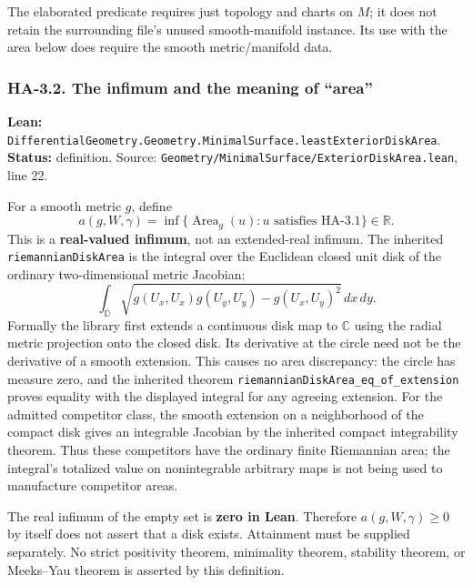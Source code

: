 \documentclass[
  letterpaper,
  11pt]{article}
\begin{document}
The elaborated predicate requires just topology and charts on \(M\); it
does not retain the surrounding file's unused smooth-manifold instance.
Its use with the area below does require the smooth metric/manifold
data.

\subsubsection{HA-3.2. The infimum and the meaning of
``area''}\label{ha-3-2}

\textbf{Lean:}
{\small\texttt{Differential\allowbreak{}Geometry.\allowbreak{}Geometry.\allowbreak{}Minimal\allowbreak{}Surface.\allowbreak{}least\allowbreak{}Exterior\allowbreak{}Disk\allowbreak{}Area}}.
\textbf{Status:} definition. Source:
{\small\texttt{Geometry/\allowbreak{}Minimal\allowbreak{}Surface/\allowbreak{}Exterior\allowbreak{}Disk\allowbreak{}Area.\allowbreak{}lean}},
line 22.

For a smooth metric \(g\), define \[
 a(g,W,\gamma)=\inf\{\operatorname{Area}_g(u):
       u\text{ satisfies HA-3.1}\}\in\mathbb R.
\] This is a \textbf{real-valued infimum}, not an extended-real infimum.
The inherited
{\small\texttt{riemannian\allowbreak{}Disk\allowbreak{}Area}} is the
integral over the Euclidean closed unit disk of the ordinary
two-dimensional metric Jacobian: \[
 \int_{\overline{\mathbb D}}
 \sqrt{g(U_x,U_x)g(U_y,U_y)-g(U_x,U_y)^2}\,dx\,dy.
\] Formally the library first extends a continuous disk map to
\(\mathbb C\) using the radial metric projection onto the closed disk.
Its derivative at the circle need not be the derivative of a smooth
extension. This causes no area discrepancy: the circle has measure zero,
and the inherited theorem
{\small\texttt{riemannian\allowbreak{}Disk\allowbreak{}Area\_\allowbreak{}eq\_\allowbreak{}of\_\allowbreak{}extension}}
proves equality with the displayed integral for any agreeing extension.
For the admitted competitor class, the smooth extension on a
neighborhood of the compact disk gives an integrable Jacobian by the
inherited compact integrability theorem. Thus these competitors have the
ordinary finite Riemannian area; the integral's totalized value on
nonintegrable arbitrary maps is not being used to manufacture competitor
areas.

The real infimum of the empty set is \textbf{zero in Lean}. Therefore
\(a(g,W,\gamma)\ge0\) by itself does not assert that a disk exists.
Attainment must be supplied separately. No strict positivity theorem,
minimality theorem, stability theorem, or Meeks--Yau theorem is asserted
by this definition.
\end{document}
